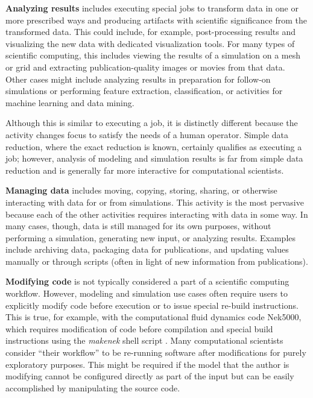 \textbf{Analyzing results} includes executing special jobs to transform
data in one or more prescribed ways and producing artifacts with
scientific significance from the transformed data. This could include, for
example, post-processing results and visualizing the new data with
dedicated visualization tools. For many types of scientific computing,
this includes viewing the results of a simulation on a mesh or grid and
extracting publication-quality images or movies from that data. Other
cases might include analyzing results in preparation for follow-on
simulations or performing feature extraction, classification, or
activities for machine learning and data mining.

Although this is similar to executing a job, it is distinctly
different because the activity changes focus to satisfy the needs of a
human operator. Simple data reduction, where the exact reduction is
known, certainly qualifies as executing a job; however, analysis of
modeling and simulation results is far from simple data reduction and is
generally far more interactive for computational scientists.

\textbf{Managing data} includes moving, copying, storing, sharing, or
otherwise interacting with data for or from simulations. This activity
is the most pervasive because each of the other activities requires
interacting with data in some way. In many cases, though, data is still
managed for its own purposes, without performing a simulation,
generating new input, or analyzing results. Examples include archiving
data, packaging data for publications, and updating values manually or through scripts (often in light of new information from publications).

\textbf{Modifying code} is not typically considered a part of a
scientific computing workflow. However, modeling and simulation use
cases often require users to explicitly modify code before execution or to issue special re-build instructions. This is true, for example, with the computational fluid dynamics code Nek5000, which requires modification of code before compilation and special build instructions using the \textit{makenek} shell script
\cite{the_nek5000_team_nek5000_2014}.
Many computational scientists consider ``their workflow'' to be re-running
software after modifications for purely exploratory purposes. This might
be required if the model that the author is modifying cannot be
configured directly as part of the input but can be easily accomplished by manipulating the source code.

